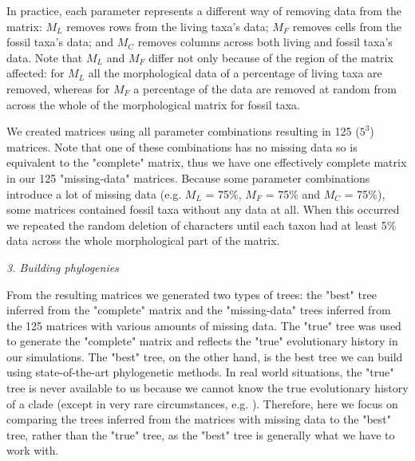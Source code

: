 \documentclass[12pt,letterpaper]{article}
\renewcommand{\subsection}[1]{%
\bigskip
\begin{center}
\begin{large}
\normalfont\itshape #1
\end{large}
\end{center}}
\begin{document}
In practice, each parameter represents a different way of removing data from the matrix: $M_{L}$ removes rows from the living taxa's data; $M_{F}$ removes cells from the fossil taxa's data; and $M_{C}$ removes columns across both living and fossil taxa's data. Note that $M_{L}$ and $M_{F}$ differ not only because of the region of the matrix affected: for $M_{L}$ all the morphological data of a percentage of living taxa are removed, whereas for $M_{F}$ a percentage of the data are removed at random from across the whole of the morphological matrix for fossil taxa.

We created matrices using all parameter combinations resulting in 125 ($5^3$) matrices. Note that one of these combinations has no missing data so is equivalent to the "complete" matrix, thus we have one effectively complete matrix in our 125 "missing-data" matrices. Because some parameter combinations introduce a lot of missing data (e.g. $M_L$ = 75\%, $M_F$ = 75\% and $M_C$ = 75\%), some matrices contained fossil taxa without any data at all. When this occurred we repeated the random deletion of characters until each taxon had at least 5\% data across the whole morphological part of the matrix.


\subsection{3. Building phylogenies}
From the resulting matrices we generated two types of trees: the "best" tree inferred from the "complete" matrix and the "missing-data" trees inferred from the 125 matrices with various amounts of missing data. The "true" tree was used to generate the "complete" matrix and reflects the "true" evolutionary history in our simulations. The "best" tree, on the other hand, is the best tree we can build using state-of-the-art phylogenetic methods. In real world situations, the "true" tree is never available to us because we cannot know the true evolutionary history of a clade (except in very rare circumstances, e.g. \citealt{rozen2005}). Therefore, here we focus on comparing the trees inferred from the matrices with missing data to the "best" tree, rather than the "true" tree, as the "best" tree is generally what we have to work with.
\end{document}
